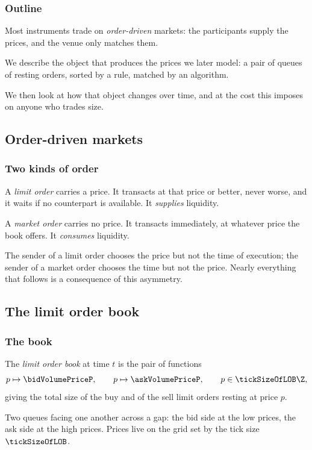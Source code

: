 \begin{frame}
  \frametitle{Outline}
\nocite{Bou18tra}
\nocite{CJP15alg}
\nocite{CST10sto}
\nocite{CKS14pri}
\nocite{GPFA13lim}
Most instruments trade on \emph{order-driven} markets:
the participants supply the prices,
and the venue only matches them.

We describe the object that produces the prices we later model:
a pair of queues of resting orders,
sorted by a rule,
matched by an algorithm.

We then look at how that object changes over time,
and at the cost this imposes on anyone who trades size.
\end{frame}

\subsection{Order-driven markets}

\begin{frame}
  \frametitle{Two kinds of order}
A \emph{limit order} carries a price.
It transacts at that price or better, never worse,
and it waits if no counterpart is available.
It \emph{supplies} liquidity.

\pause

A \emph{market order} carries no price.
It transacts immediately, at whatever price the book offers.
It \emph{consumes} liquidity.

\pause

The sender of a limit order chooses the price but not the time of execution;
the sender of a market order chooses the time but not the price.
Nearly everything that follows is a consequence of this asymmetry.
\end{frame}

\subsection{The limit order book}

\begin{frame}
  \frametitle{The book}
\begin{defi}
\label{def.limitOrderBook}
The \emph{limit order book} at time $t$ is the pair of functions
\[
p \mapsto \bidVolumePriceP, \qquad p \mapsto \askVolumePriceP, \qquad p \in \tickSizeOfLOB \Z,
\]
giving the total size of the buy and of the sell limit orders resting at price $p$.
\end{defi}

\pause

Two queues facing one another across a gap:
the bid side at the low prices,
the ask side at the high prices.
Prices live on the grid set by the tick size $\tickSizeOfLOB$.
\end{frame}

